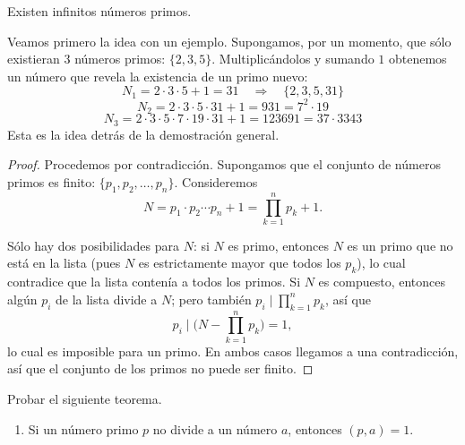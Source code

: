 \documentclass[12pt,a4paper]{book}
\begin{document}
  \begin{teorema}
    Existen infinitos números primos.
  \end{teorema}
  
  Veamos primero la idea con un ejemplo. Supongamos, por un momento, que sólo existieran 3 números primos: $\{2,3,5\}$. Multiplicándolos y sumando $1$ obtenemos un número que revela la existencia de un primo nuevo:
  \begin{equation*}
    N_1 = 2\cdot 3\cdot 5+1 = 31 \quad \Longrightarrow \quad \{2,3,5,31\}
  \end{equation*}
  \begin{equation*}
    N_2 = 2\cdot 3\cdot 5\cdot 31+1 = 931 = 7^2 \cdot 19
  \end{equation*}
  \begin{equation*}
    N_3 = 2\cdot 3\cdot 5\cdot 7\cdot 19\cdot 31+1 = 123691 = 37\cdot 3343
  \end{equation*}
  Esta es la idea detrás de la demostración general.
  
  \begin{proof}
    Procedemos por contradicción. Supongamos que el conjunto de números primos es finito: $\{p_1,p_2,\dots,p_n\}$. Consideremos
    \begin{equation*}
      N = p_1\cdot p_2 \cdots p_n + 1 = \prod_{k=1}^{n} p_k + 1.
    \end{equation*}
  
    Sólo hay dos posibilidades para $N$: si $N$ es primo, entonces $N$ es un primo que no está en la lista (pues $N$ es estrictamente mayor que todos los $p_k$), lo cual contradice que la lista contenía a todos los primos. Si $N$ es compuesto, entonces algún $p_i$ de la lista divide a $N$; pero también $p_i \mid \prod_{k=1}^n p_k$, así que
    \begin{equation*}
      p_i \;\Big|\; \Big(N - \prod_{k=1}^n p_k\Big) = 1,
    \end{equation*}
    lo cual es imposible para un primo. En ambos casos llegamos a una contradicción, así que el conjunto de los primos no puede ser finito.
  \end{proof}
  
  \begin{problema}
    Probar el siguiente teorema.
    \begin{enumerate}[label=\roman*)]
      \item Si un número primo $p$ no divide a un número $a$, entonces $(p,a)=1$.
    \end{enumerate}
  \end{problema}
  
\end{document}
